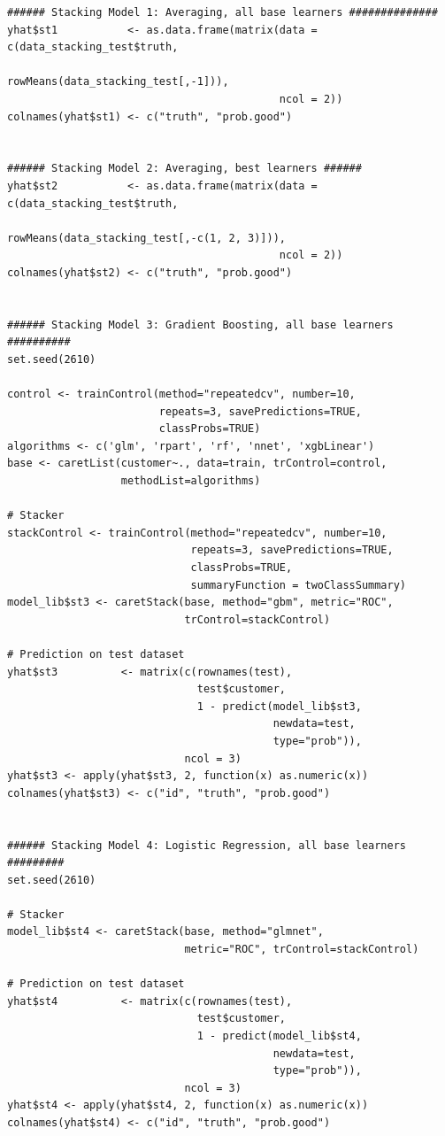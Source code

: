 \documentclass[12pt]{article}
\begin{document}
\begin{lstlisting}
###### Stacking Model 1: Averaging, all base learners ##############
yhat$st1           <- as.data.frame(matrix(data = c(data_stacking_test$truth, 
                                                    rowMeans(data_stacking_test[,-1])), 
                                           ncol = 2))
colnames(yhat$st1) <- c("truth", "prob.good")


###### Stacking Model 2: Averaging, best learners ######
yhat$st2           <- as.data.frame(matrix(data = c(data_stacking_test$truth, 
                                                    rowMeans(data_stacking_test[,-c(1, 2, 3)])), 
                                           ncol = 2))
colnames(yhat$st2) <- c("truth", "prob.good")


###### Stacking Model 3: Gradient Boosting, all base learners ##########
set.seed(2610)

control <- trainControl(method="repeatedcv", number=10, 
                        repeats=3, savePredictions=TRUE, 
                        classProbs=TRUE)
algorithms <- c('glm', 'rpart', 'rf', 'nnet', 'xgbLinear')
base <- caretList(customer~., data=train, trControl=control, 
                  methodList=algorithms)

# Stacker
stackControl <- trainControl(method="repeatedcv", number=10, 
                             repeats=3, savePredictions=TRUE, 
                             classProbs=TRUE,
                             summaryFunction = twoClassSummary)
model_lib$st3 <- caretStack(base, method="gbm", metric="ROC", 
                            trControl=stackControl)

# Prediction on test dataset
yhat$st3          <- matrix(c(rownames(test),
                              test$customer,
                              1 - predict(model_lib$st3,
                                          newdata=test,
                                          type="prob")),
                            ncol = 3)
yhat$st3 <- apply(yhat$st3, 2, function(x) as.numeric(x))
colnames(yhat$st3) <- c("id", "truth", "prob.good")


###### Stacking Model 4: Logistic Regression, all base learners #########
set.seed(2610)

# Stacker
model_lib$st4 <- caretStack(base, method="glmnet",
                            metric="ROC", trControl=stackControl)

# Prediction on test dataset
yhat$st4          <- matrix(c(rownames(test),
                              test$customer,
                              1 - predict(model_lib$st4,
                                          newdata=test,
                                          type="prob")),
                            ncol = 3)
yhat$st4 <- apply(yhat$st4, 2, function(x) as.numeric(x))
colnames(yhat$st4) <- c("id", "truth", "prob.good")
\end{lstlisting}



\clearpage


\end{document}
